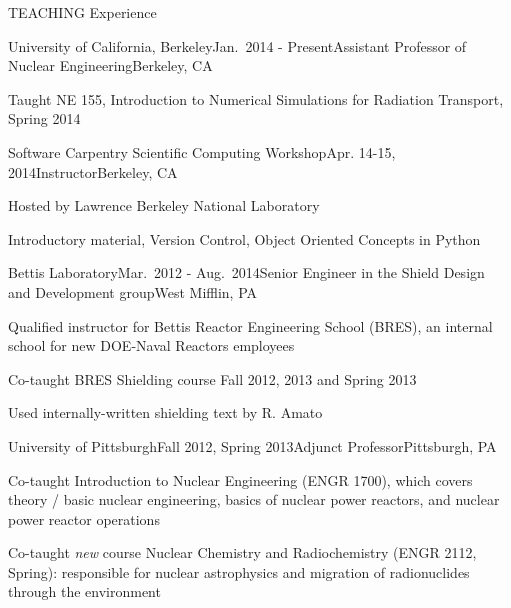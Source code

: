 \documentclass{resume2} %
\begin{document}

\begin{rSection}{TEACHING Experience}

\begin{rSubsection}{University of California, Berkeley}{Jan.\ 2014 - Present}{Assistant Professor of Nuclear Engineering}{Berkeley, CA}
\item Taught NE 155, Introduction to Numerical Simulations for Radiation Transport, Spring 2014
\end{rSubsection}


\begin{rSubsection}{Software Carpentry Scientific Computing Workshop}{Apr. 14-15, 2014}{Instructor}{Berkeley, CA}
\item Hosted by Lawrence Berkeley National Laboratory
\item Introductory material, Version Control, Object Oriented Concepts in Python
\end{rSubsection}



\begin{rSubsection}{Bettis Laboratory}{Mar.\ 2012 - Aug.\ 2014}{Senior Engineer in the Shield Design and Development group}{West Mifflin, PA}
\item Qualified instructor for Bettis Reactor Engineering School (BRES), an internal school for new DOE-Naval Reactors employees
\item Co-taught BRES Shielding course Fall 2012, 2013 and Spring 2013
\item Used internally-written shielding text by R. Amato
\end{rSubsection}


\begin{rSubsection}{University of Pittsburgh}{Fall 2012, Spring 2013}{Adjunct Professor}{Pittsburgh, PA}
\item Co-taught Introduction to Nuclear Engineering (ENGR 1700), which covers theory / basic nuclear engineering, basics of nuclear power reactors, and nuclear power reactor operations
\item Co-taught \textit{new} course Nuclear Chemistry and Radiochemistry (ENGR 2112, Spring): responsible for nuclear astrophysics and migration of radionuclides through the environment
\end{rSubsection}


\end{rSection}
\end{document}
